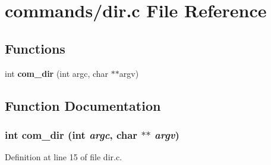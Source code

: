 \section{commands/dir.c File Reference}
\label{dir_8c}
\subsection*{Functions}
\begin{DoxyCompactItemize}
\item 
int {\bf com\_\-dir} (int argc, char $\ast$$\ast$argv)
\end{DoxyCompactItemize}


\subsection{Function Documentation}
\subsubsection[{com\_\-dir}]{\setlength{\rightskip}{0pt plus 5cm}int com\_\-dir (int {\em argc}, \/  char $\ast$$\ast$ {\em argv})}\label{dir_8c_acdca369eeec56aa38f5bcc54d45b87bf}


Definition at line 15 of file dir.c.

